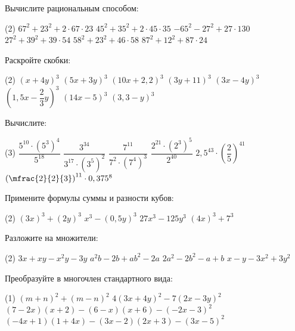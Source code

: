 \begin{class}[number=5]
	\begin{listofex}
		\item Вычислите рациональным способом:
		\begin{tasks}(2)
			\task \( 67^2+23^2+2 \cdot 67 \cdot 23 \)
			\task \( 45^2+35^2 + 2 \cdot 45 \cdot 35 \)
			\task \( -65^2 -27^2 + 27 \cdot 130 \)
			\task \( 27^2 + 39^2 + 39 \cdot 54 \)
			\task \( 58^2+23^2+46 \cdot 58 \)
			\task \( 87^2+12^2+87 \cdot 24 \)
		\end{tasks}
		\item Раскройте скобки:
		\begin{tasks}(2)
			\task \( (x+4y)^3 \)
			\task \( (5x+3y)^3 \)
			\task \( (10x+2,2)^3 \)
			\task \( (3y+11)^3 \)
			\task \( (3x-4y)^3 \)
			\task \( \left(1,5x-\dfrac{2}{3}y \right)^3 \)
			\task \( (14x-5)^3 \)
			\task \( (3,3-y)^3 \)
		\end{tasks}
		\item Вычислите:
		\begin{tasks}(3)
			\task \( \dfrac{5^{10} \cdot (5^3)^4}{5^{18}} \)
			\task \( \dfrac{3^{34}}{3^{17} \cdot (3^5)^2} \)
			\task \( \dfrac{7^{11}}{7^2 \cdot (7^4)^3} \)
			\task \( \dfrac{2^{21} \cdot (2^3)^5}{2^{40}} \)
			\task \( 2,5^{43} \cdot \left( \dfrac{2}{5} \right)^{41}  \)
			\task \( \left( \mfrac{2}{2}{3} \right)^{11} \cdot 0,375^8 \)
		\end{tasks}
		\item Примените формулы суммы и разности кубов:
		\begin{tasks}(2)
			\task \( (3x)^3+(2y)^3 \)
			\task \( x^3-(0,5y)^3 \)
			\task \( 27x^3-125y^3 \)
			\task \( (4x)^3+7^3 \)
		\end{tasks}
		\item Разложите на множители:
		\begin{tasks}(2)
			\task \( 3x+xy-x^2y-3y \)
			\task \( a^2b-2b+ab^2-2a \)
			\task \( 2a^2-2b^2-a+b \)
			\task \( x-y-3x^2+3y^2 \)
		\end{tasks}
		\item Преобразуйте в многочлен стандартного вида:
		\begin{tasks}(1)
			\task \( (m+n)^2+(m-n)^2 \)
			\task \( 4(3x+4y)^2-7(2x-3y)^2 \)
			\task \( (7-2x)(x+2)-(6-x)(x+6)-(-2x-3)^2 \)
			\task \( (-4x+1)(1+4x)-(3x-2)(2x+3)-(3x-5)^2 \)
		\end{tasks}
	\end{listofex}
\end{class}

